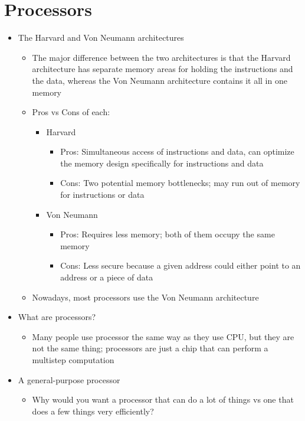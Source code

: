 \documentclass{article}
\begin{document}
\section{Processors}
\begin{itemize}
	\item The Harvard and Von Neumann architectures
		\begin{itemize}
			\item The major difference between the two architectures is that the Harvard architecture has separate memory areas for holding the instructions and the data, whereas the Von Neumann architecture contains it all in one memory
			\item Pros vs Cons of each:
				\begin{itemize}
					\item Harvard
						\begin{itemize}
							\item Pros: Simultaneous access of instructions and data, can optimize the memory design specifically for instructions and data
							\item Cons: Two potential memory bottlenecks; may run out of memory for instructions or data
						\end{itemize}
					\item Von Neumann
						\begin{itemize}
							\item Pros: Requires less memory; both of them occupy the same memory
							\item Cons: Less secure because a given address could either point to an address or a piece of data
						\end{itemize}
				\end{itemize}
			\item Nowadays, most processors use the Von Neumann architecture
		\end{itemize}
	\item What are processors?
		\begin{itemize}
			\item Many people use processor the same way as they use CPU, but they are not the same thing; processors are just a chip that can perform a multistep computation
		\end{itemize}
	\item A general-purpose processor
		\begin{itemize}
			\item Why would you want a processor that can do a lot of things vs one that does a few things very efficiently?

\end{itemize}
\end{itemize}
\end{document}
